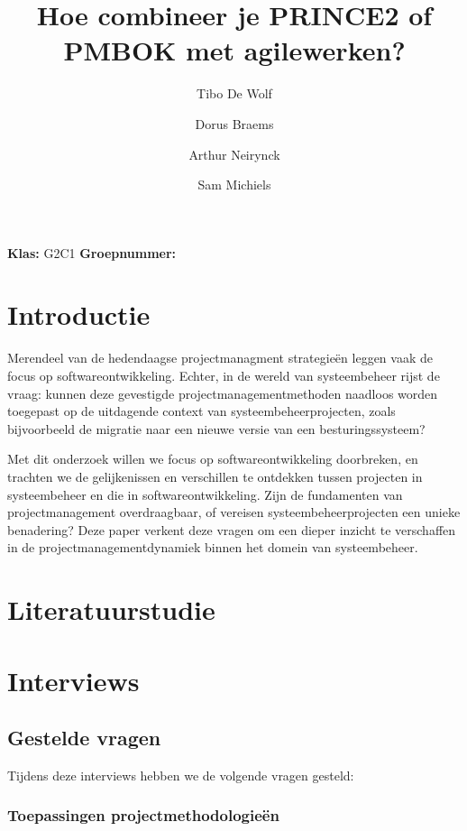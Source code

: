 \documentclass[dutch]{hogent-article}
\title{Hoe combineer je PRINCE2 of PMBOK met agile\linebreak werken?}
\author{Tibo De Wolf}
\author{Dorus Braems}
\author{Arthur Neirynck}
\author{Sam Michiels}
\begin{document}
\begin{abstract}

\end{abstract}
\bigskip
\textbf{Klas:} G2C1
\newline
\textbf{Groepnummer:} 


\newpage

\tableofcontents
\pagebreak

\section{Introductie}%
\label{sec:introductie}

Merendeel van de hedendaagse projectmanagment strategie\"en leggen vaak de focus op softwareontwikkeling. Echter, in de wereld van systeembeheer rijst de vraag: kunnen deze gevestigde projectmanagementmethoden naadloos worden toegepast op de uitdagende context van systeembeheerprojecten, zoals bijvoorbeeld de migratie naar een nieuwe versie van een besturingssysteem?
\newline

Met dit onderzoek willen we focus op softwareontwikkeling doorbreken, en trachten we de gelijkenissen en verschillen te ontdekken tussen projecten in systeembeheer en die in softwareontwikkeling. Zijn de fundamenten van projectmanagement overdraagbaar, of vereisen systeembeheerprojecten een unieke benadering? Deze paper verkent deze vragen om een dieper inzicht te verschaffen in de projectmanagementdynamiek binnen het domein van systeembeheer.


\section{Literatuurstudie}%
\label{sec:literatuurstudie}


\section{Interviews}
\label{sec:interviews}


\subsection{Gestelde vragen}%
\label{ssec:gestelde-vragen}

Tijdens deze interviews hebben we de volgende vragen gesteld:

\subsubsection{Toepassingen projectmethodologieën}
\label{ssec:toepassingen-projectmethodologieën}
\end{document}
